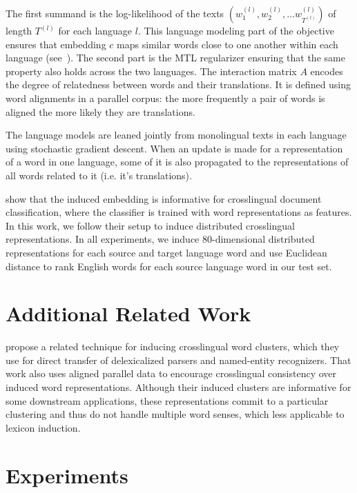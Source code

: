 \documentclass[11pt]{article}
\begin{document}
The first summand is the log-likelihood of the texts $(w_1^{(l)}, w_2^{(l)}, \dots w_{T^{(l)}}^{(l)})$ of length $T^{(l)}$ for each language $l$.  This language modeling part of the objective ensures that embedding $c$ maps similar words close to one another within each language (see~).  The second part is the MTL regularizer ensuring that the same property also holds across the two languages.  
The interaction matrix $A$ encodes the degree of relatedness between words and their translations.   
It is defined using word alignments in a parallel corpus: the more frequently a pair of words is aligned the more likely they are translations.

The language models are leaned jointly from monolingual texts in each language using stochastic gradient descent.  When an update is made for a representation of a word in one language, some of it is also propagated to the representations of all words related to it (i.e. it's translations).

 show that the induced embedding is informative for crosslingual document classification, where the classifier is trained with word representations as features.
In this work, we follow their setup to induce distributed crosslingual representations. %
In all experiments, we induce 80-dimensional distributed representations for each source and target language word and use Euclidean distance to rank English words for each source language word in our test set.


\section{Additional Related Work} \label{sect:rework}

 propose a related technique for inducing crosslingual word clusters, which they use for direct transfer of delexicalized parsers and named-entity recognizers. 
That work also uses aligned parallel data to encourage crosslingual consistency over induced word representations.
Although their induced clusters are informative for some downstream applications, these representations commit to a particular clustering and thus do not handle multiple word senses, which  less applicable to lexicon induction.

\section{Experiments} \label{sect:experiments}
\end{document}
